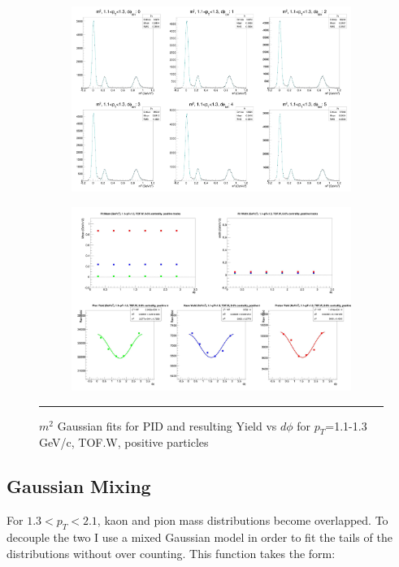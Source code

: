 \begin{figure}[H]
  \centering
    \begin{subfigure}[p]{1\textwidth}
    \includegraphics[width=1\textwidth]{lowptfits/yieldvsdphi_tof1_cent0_ch1_pT-11-13.jpg}
    \end{subfigure}
    \begin{subfigure}[p]{1\textwidth}
    \includegraphics[width=1\textwidth]{lowptfits/fitParams_tof1_cent0_ch1_pT-11-13.jpg}
    \end{subfigure}
    \rule{35em}{0.5pt}
  \caption[PID fits and Yield vs $d\phi$ for $p_T$=1.1-1.3 GeV/c, TOF.W, positive particles ]{$m^2$ Gaussian fits for PID and resulting Yield vs $d\phi$ for $p_T$=1.1-1.3 GeV/c, TOF.W, positive particles}
  \label{fig:fits11-13pos}
\end{figure}
\restoregeometry


\subsection{Gaussian Mixing}
For $1.3<p_T<2.1$, kaon and pion mass distributions become overlapped. To decouple the two I use a mixed Gaussian model in order to fit the tails of the distributions without over counting. This function takes the form:

